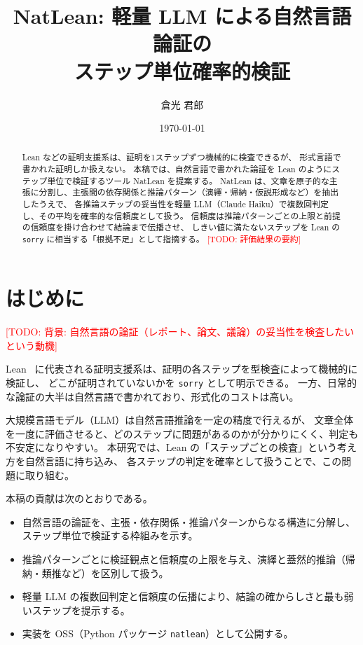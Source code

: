 \documentclass[a4paper,11pt]{ltjsarticle}
\title{NatLean: 軽量 LLM による自然言語論証の\\ステップ単位確率的検証}
\author{倉光 君郎}
\date{\today}
\newcommand{\todo}[1]{\textcolor{red}{[TODO: #1]}}
\begin{document}
\maketitle

\begin{abstract}
Lean などの証明支援系は、証明を1ステップずつ機械的に検査できるが、
形式言語で書かれた証明しか扱えない。
本稿では、自然言語で書かれた論証を Lean のようにステップ単位で検証するツール NatLean を提案する。
NatLean は、文章を原子的な主張に分割し、主張間の依存関係と推論パターン（演繹・帰納・仮説形成など）を抽出したうえで、
各推論ステップの妥当性を軽量 LLM（Claude Haiku）で複数回判定し、その平均を確率的な信頼度として扱う。
信頼度は推論パターンごとの上限と前提の信頼度を掛け合わせて結論まで伝播させ、
しきい値に満たないステップを Lean の \texttt{sorry} に相当する「根拠不足」として指摘する。
\todo{評価結果の要約}
\end{abstract}

\section{はじめに}

\todo{背景: 自然言語の論証（レポート、論文、議論）の妥当性を検査したいという動機}

Lean~\cite{moura2021lean4} に代表される証明支援系は、証明の各ステップを型検査によって機械的に検証し、
どこが証明されていないかを \texttt{sorry} として明示できる。
一方、日常的な論証の大半は自然言語で書かれており、形式化のコストは高い。

大規模言語モデル（LLM）は自然言語推論を一定の精度で行えるが、
文章全体を一度に評価させると、どのステップに問題があるのかが分かりにくく、判定も不安定になりやすい。
本研究では、Lean の「ステップごとの検査」という考え方を自然言語に持ち込み、
各ステップの判定を確率として扱うことで、この問題に取り組む。

本稿の貢献は次のとおりである。
\begin{itemize}
  \item 自然言語の論証を、主張・依存関係・推論パターンからなる構造に分解し、ステップ単位で検証する枠組みを示す。
  \item 推論パターンごとに検証観点と信頼度の上限を与え、演繹と蓋然的推論（帰納・類推など）を区別して扱う。
  \item 軽量 LLM の複数回判定と信頼度の伝播により、結論の確からしさと最も弱いステップを提示する。
  \item 実装を OSS（Python パッケージ \texttt{natlean}）として公開する。
\end{itemize}
\end{document}
